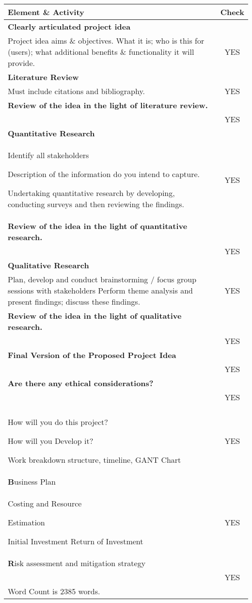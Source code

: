 \documentclass[a4paper]{report}
\begin{document}
\begin{tabular}{| p{10cm} | c |}
\hline
\textbf{Element \& Activity} & \textbf{Check} \\
\hline
\textbf{Clearly articulated project idea} \\ Project idea aims \& objectives. What it is; who is this for (users); what additional
benefits \& functionality it will provide. &  YES \\
\hline
\textbf{Literature Review} \\ Must include citations and bibliography. &  YES  \\
\hline
\textbf{Review of the idea in the light of literature review.} \\  & YES \\
\hline
\textbf{Quantitative Research} \\ Identify all stakeholders 

Description of the information do you intend to capture. 

Undertaking quantitative research by developing, conducting surveys and then
reviewing the findings. &  YES  \\
\hline
\textbf{Review of the idea in the light of quantitative research.} \\  &  YES  \\
\hline
\textbf{Qualitative Research} \\ Plan, develop and conduct brainstorming / focus group sessions with stakeholders
Perform theme analysis and present findings; discuss these findings. &  YES  \\
\hline
\textbf{Review of the idea in the light of qualitative research.} \\  &  YES  \\
\hline
\textbf{Final Version of the Proposed Project Idea} \\  &  YES  \\
\hline
\textbf{Are there any ethical considerations?} \\  &  YES  \\
\hline
\textbf {} \\ How will you do this project?

How will you Develop it?

Work breakdown structure, timeline, GANT Chart &  YES  \\
\hline
\textbf Business Plan\\ Costing and Resource 

Estimation

Initial Investment
Return of Investment &  YES  \\
\hline
\textbf Risk assessment and mitigation strategy\\ &  YES  \\
\hline

Word Count is 2385 words.
\end{tabular}



\end{document}
